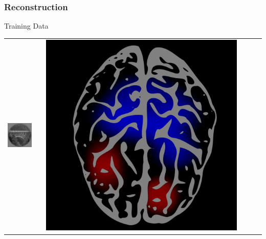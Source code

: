 \documentclass{beamer}
\begin{document}
\begin{frame}
\frametitle{Reconstruction}
\begin{center}
Training Data
\\
\begin{tabular}{ccc||ccc}
\hline
\includegraphics[scale = .26]{img1.png} & \hspace{0.2in} & \includegraphics[scale = 0.035]{brain1.png} &

\end{tabular}
\end{center}
\end{frame}
\end{document}
